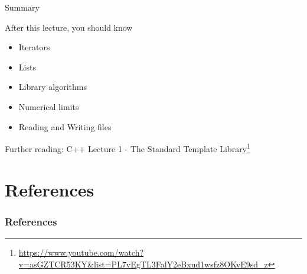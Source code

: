 \documentclass[\classoption]{beamer}
\begin{document}
\begin{frame}{Summary}
\begin{block}{After this lecture, you should know}
\begin{itemize}
\item Iterators
\item Lists
\item Library algorithms
\item Numerical limits
\item Reading and Writing files
\end{itemize}
\end{block}

\begin{block}{Further reading:}
C++ Lecture 1 - The Standard Template Library\footnote{\tiny\url{https://www.youtube.com/watch?v=asGZTCR53KY&list=PL7vEgTL3FalY2eBxud1wsfz8OKvE9sd_z}}
\end{block}


\end{frame}


\section{References}

\begin{frame}[t, allowframebreaks]
\frametitle{References}


\end{frame}
\end{document}
